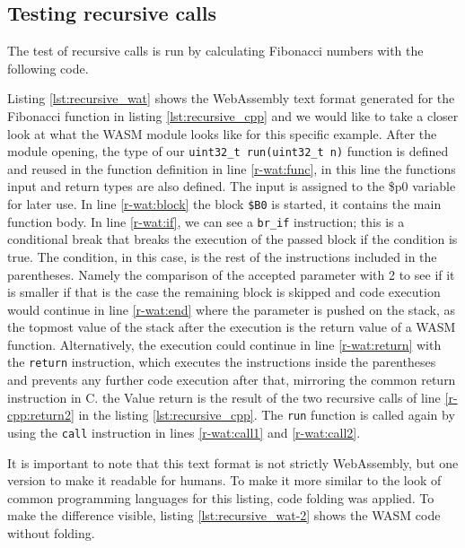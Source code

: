\subsection{Testing recursive calls}\label{subsec:m_test_recursive}
The test of recursive calls is run by calculating Fibonacci numbers with the following code.


Listing \ref{lst:recursive_wat} shows the WebAssembly text format generated for the Fibonacci function in listing \ref{lst:recursive_cpp} and we would like to take a closer look at what the WASM module looks like for this specific example. After the module opening, the type of our \lstinline{uint32_t run(uint32_t n)} function is defined and reused in the function definition in line \ref{r-wat:func}, in this line the functions input and return types are also defined. The input is assigned to the \$p0 variable for later use. In line \ref{r-wat:block} the block \lstinline{$B0} is started, it contains the main function body. In line \ref{r-wat:if}, we can see a \lstinline{br_if} instruction; this is a conditional break that breaks the execution of the passed block if the condition is true. The condition, in this case, is the rest of the instructions included in the parentheses. Namely the comparison of the accepted parameter with 2 to see if it is smaller if that is the case the remaining block is skipped and code execution would continue in line \ref{r-wat:end} where the parameter is pushed on the stack, as the topmost value of the stack after the execution is the return value of a WASM function. Alternatively, the execution could continue in line \ref{r-wat:return} with the \lstinline{return} instruction, which executes the instructions inside the parentheses and prevents any further code execution after that, mirroring the common return instruction in C. the Value return is the result of the two recursive calls of line \ref{r-cpp:return2} in the listing \ref{lst:recursive_cpp}. The \lstinline{run} function is called again by using the \lstinline{call} instruction in lines \ref{r-wat:call1} and \ref{r-wat:call2}.

It is important to note that this text format is not strictly WebAssembly, but one version to make it readable for humans. To make it more similar to the look of common programming languages for this listing, code folding was applied. To make the difference visible, listing \ref{lst:recursive_wat-2} shows the WASM code without folding.


